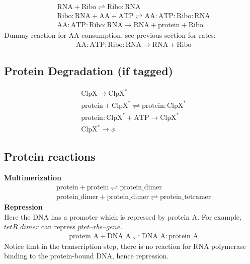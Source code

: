 \begin{align}
& \mathrm{RNA} + \mathrm{Ribo} \rightleftharpoons \mathrm{Ribo}\!:\!\mathrm{RNA} \\
& \mathrm{Ribo}\!:\!\mathrm{RNA} + \mathrm{AA} + \mathrm{ATP} \rightleftharpoons \mathrm{AA}\!:\!\mathrm{ATP}\!:\!\mathrm{Ribo}\!:\!\mathrm{RNA} \\
& \mathrm{AA}\!:\!\mathrm{ATP}\!:\!\mathrm{Ribo}\!:\!\mathrm{RNA} \rightarrow \mathrm{RNA} +  \mathrm{protein} + \mathrm{Ribo} 
\end{align}
Dummy reaction for AA consumption, see previous section for rates:\\
\begin{align}
& \mathrm{AA}\!:\!\mathrm{ATP}\!:\!\mathrm{Ribo}\!:\!\mathrm{RNA} \rightarrow \mathrm{RNA} +   \mathrm{Ribo} 
\end{align}

\subsection{Protein Degradation (if tagged)}

\begin{align}
& \mathrm{ClpX}  \rightarrow \mathrm{ClpX^*} \\
& \mathrm{protein} + \mathrm{ClpX^*} \rightleftharpoons \mathrm{protein}\!:\!\mathrm{ClpX^*} \\
& \mathrm{protein}\!:\!\mathrm{ClpX^*} + \mathrm{ATP} \rightarrow \mathrm{ClpX^*} \\
& \mathrm{ClpX^*} \rightarrow \phi
\end{align}

\subsection{Protein reactions}
\textbf{Multimerization}
\begin{align}
& \mathrm{protein} + \mathrm{protein} \rightleftharpoons \mathrm{protein\_dimer} \\
 & \mathrm{protein\_dimer} + \mathrm{protein\_dimer} \rightleftharpoons \mathrm{protein\_tetramer}
\end{align}
\textbf{Repression}\\
Here the DNA has a promoter which is repressed by protein A. For example, $tetR\_dimer$ can repress $ptet\textrm{--}rbs\textrm{--}gene$.
\begin{align}
& \mathrm{protein\_A} + \mathrm{DNA\_A} \rightleftharpoons \mathrm{DNA\_A}\!:\!\mathrm{protein\_A} 
\end{align}
Notice that in the transcription step, there is no reaction for RNA polymerase binding to the protein-bound DNA, hence repression. \\

